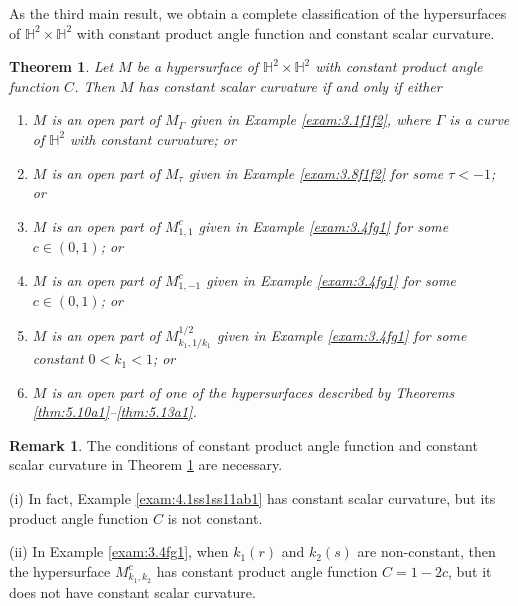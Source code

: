\documentclass[reqno]{amsart}%
\newtheorem{theorem}{Theorem}[section]   %
\theoremstyle{definition}
\newtheorem{remark}{Remark}[section]
\numberwithin{equation}{section}
\begin{document}
As the third main result, we obtain a complete classification of
the hypersurfaces of $\mathbb{H}^2\times\mathbb{H}^2$
with constant product angle function and constant scalar curvature.

\begin{theorem}\label{thm:1.3}
Let $M$ be a hypersurface of $\mathbb{H}^2\times \mathbb{H}^2$ with constant product angle function $C$. Then
$M$ has constant scalar curvature if and only if either
\begin{enumerate}
\item[(1)]
$M$ is an open part of $M_\Gamma$ given in Example \ref{exam:3.1f1f2},  where $\Gamma$ is a curve of $\mathbb{H}^2$ with constant curvature; or

\item[(2)]
$M$ is an open part of $M_\tau$ given in Example \ref{exam:3.8f1f2} for some $\tau<-1$; or

\item[(3)]
$M$ is an open part of $M_{1,1}^c$ given in Example \ref{exam:3.4fg1} for some $c\in(0,1)$; or

\item[(4)]
$M$ is an open part of $M_{1,-1}^c$ given in Example \ref{exam:3.4fg1} for some $c\in(0,1)$; or


\item[(5)]
$M$ is an open part of $M_{k_1,1/k_1}^{1/2}$ given in Example \ref{exam:3.4fg1} for some constant $0<k_1<1$; or

\item[(6)]
$M$ is an open part of one of the hypersurfaces described by Theorems \ref{thm:5.10a1}--\ref{thm:5.13a1}.

\end{enumerate}
\end{theorem}

\begin{remark}\label{rem:1.4}
The conditions of constant product angle function and constant scalar curvature in Theorem \ref{thm:1.3} are necessary.

(i) In fact, Example \ref{exam:4.1ss1ss11ab1} has constant scalar curvature, but its product angle function $C$ is not constant.

%
(ii) In Example \ref{exam:3.4fg1}, when $k_1(r)$ and
$k_2(s)$ are non-constant, then the
hypersurface $M_{k_1,k_2}^c$ has constant product angle function $C=1-2c$, but
it does not have constant scalar curvature.
\end{remark}
\end{document}
